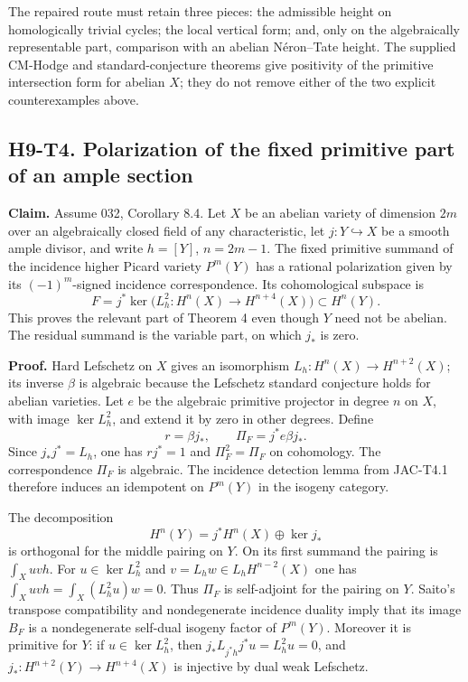 The repaired route must retain three pieces: the admissible height on
homologically trivial cycles; the local vertical form; and, only on the
algebraically representable part, comparison with an abelian
N\'eron--Tate height. The supplied CM-Hodge and standard-conjecture theorems
give positivity of the primitive intersection form for abelian $X$; they
do not remove either of the two explicit counterexamples above.

\subsection*{H9-T4. Polarization of the fixed primitive part of an ample section}

\textbf{Claim.} Assume 032, Corollary 8.4. Let $X$ be an abelian variety
of dimension $2m$ over an algebraically closed field of any characteristic,
let $j:Y\hookrightarrow X$ be a smooth ample divisor, and write
$h=[Y]$, $n=2m-1$. The fixed primitive summand of the incidence higher
Picard variety $P^m(Y)$ has a rational polarization given by its
$(-1)^m$-signed incidence correspondence. Its cohomological subspace is
\[
 F=j^*\ker\bigl(L_h^2:H^{n}(X)\longrightarrow H^{n+4}(X)\bigr)
       \subset H^n(Y).
\]
This proves the relevant part of Theorem 4 even though $Y$ need not be
abelian. The residual summand is the variable part, on which $j_*$ is zero.

\textbf{Proof.}
Hard Lefschetz on $X$ gives an isomorphism
$L_h:H^n(X)\to H^{n+2}(X)$; its inverse $\beta$ is algebraic because
the Lefschetz standard conjecture holds for abelian varieties. Let $e$
be the algebraic primitive projector in degree $n$ on $X$, with image
$\ker L_h^2$, and extend it by zero in other degrees. Define
\[
 r=\beta j_*,\qquad \Pi_F=j^*e\beta j_*.
\]
Since $j_*j^*=L_h$, one has $rj^*=1$ and $\Pi_F^2=\Pi_F$ on
cohomology. The correspondence $\Pi_F$ is algebraic. The incidence
detection lemma from JAC-T4.1 therefore induces an idempotent on
$P^m(Y)$ in the isogeny category.

The decomposition
\[
 H^n(Y)=j^*H^n(X)\oplus\ker j_*
\]
is orthogonal for the middle pairing on $Y$. On its first summand the
pairing is $\int_X uvh$. For $u\in\ker L_h^2$ and
$v=L_hw\in L_hH^{n-2}(X)$ one has
$\int_Xuvh=\int_X(L_h^2u)w=0$. Thus $\Pi_F$ is self-adjoint for
the pairing on $Y$. Saito's transpose compatibility and nondegenerate
incidence duality imply that its image $B_F$ is a nondegenerate
self-dual isogeny factor of $P^m(Y)$. Moreover it is primitive for $Y$:
if $u\in\ker L_h^2$, then
$j_*L_{j^*h}j^*u=L_h^2u=0$, and
$j_*:H^{n+2}(Y)\to H^{n+4}(X)$ is injective by dual weak Lefschetz.

